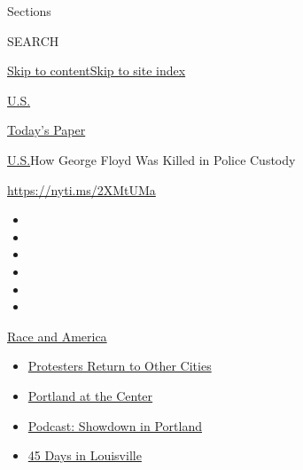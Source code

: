 Sections

SEARCH

\protect\hyperlink{site-content}{Skip to
content}\protect\hyperlink{site-index}{Skip to site index}

\href{https://www.nytimes.com/section/us}{U.S.}

\href{https://myaccount.nytimes.com/auth/login?response_type=cookie\&client_id=vi}{}

\href{https://www.nytimes.com/section/todayspaper}{Today's Paper}

\href{/section/us}{U.S.}\textbar{}How George Floyd Was Killed in Police
Custody

\url{https://nyti.ms/2XMtUMa}

\begin{itemize}
\item
\item
\item
\item
\item
\item
\end{itemize}

\href{https://www.nytimes.com/news-event/george-floyd-protests-minneapolis-new-york-los-angeles?action=click\&pgtype=Article\&state=default\&region=TOP_BANNER\&context=storylines_menu}{Race
and America}

\begin{itemize}
\tightlist
\item
  \href{https://www.nytimes.com/2020/07/26/us/protests-portland-seattle-trump.html?action=click\&pgtype=Article\&state=default\&region=TOP_BANNER\&context=storylines_menu}{Protesters
  Return to Other Cities}
\item
  \href{https://www.nytimes.com/2020/07/24/us/portland-oregon-protests-white-race.html?action=click\&pgtype=Article\&state=default\&region=TOP_BANNER\&context=storylines_menu}{Portland
  at the Center}
\item
  \href{https://www.nytimes.com/2020/07/23/podcasts/the-daily/portland-protests.html?action=click\&pgtype=Article\&state=default\&region=TOP_BANNER\&context=storylines_menu}{Podcast:
  Showdown in Portland}
\item
  \href{https://www.nytimes.com/interactive/2020/07/16/us/black-lives-matter-protests-louisville-breonna-taylor.html?action=click\&pgtype=Article\&state=default\&region=TOP_BANNER\&context=storylines_menu}{45
  Days in Louisville}
\end{itemize}

